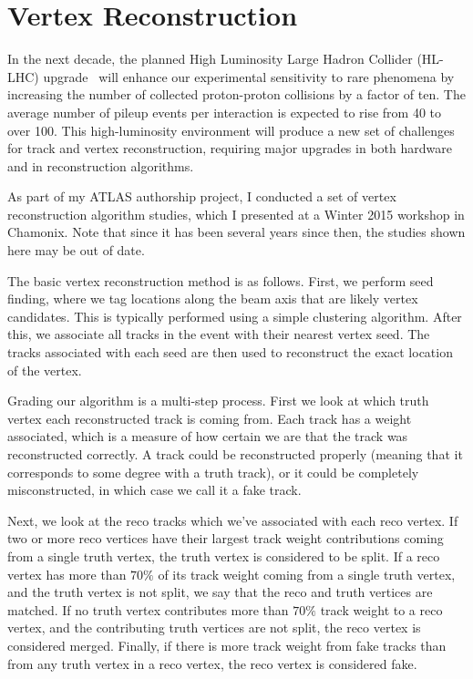 \chapter{Vertex Reconstruction}

In the next decade, the planned High Luminosity Large Hadron Collider (HL-LHC) upgrade~\cite{Apollinari:2284929} will enhance our experimental sensitivity to rare phenomena by increasing the number of collected proton-proton collisions by a factor of ten. The average number of pileup events per interaction is expected to rise from 40 to over 100. This high-luminosity environment will produce a new set of challenges for track and vertex reconstruction, requiring major upgrades in both hardware and in reconstruction algorithms.

As part of my ATLAS authorship project, I conducted a set of vertex reconstruction algorithm studies, which I presented at a Winter 2015 workshop in Chamonix. Note that since it has been several years since then, the studies shown here may be out of date.

The basic vertex reconstruction method is as follows. First, we perform seed finding, where we tag locations along the beam axis that are likely vertex candidates. This is typically performed using a simple clustering algorithm. After this, we associate all tracks in the event with their nearest vertex seed. The tracks associated with each seed are then used to reconstruct the exact location of the vertex.

Grading our algorithm is a multi-step process. First we look at which truth vertex each reconstructed track is coming from. Each track has a weight associated, which is a measure of how certain we are that the track was reconstructed correctly. A track could be reconstructed properly (meaning that it corresponds to some degree with a truth track), or it could be completely misconstructed, in which case we call it a fake track.

Next, we look at the reco tracks which we've associated with each reco vertex. If two or more reco vertices have their largest track weight contributions coming from a single truth vertex, the truth vertex is considered to be split. If a reco vertex has more than $70\%$ of its track weight coming from a single truth vertex, and the truth vertex is not split, we say that the reco and truth vertices are matched. If no truth vertex contributes more than $70\%$ track weight to a reco vertex, and the contributing truth vertices are not split, the reco vertex is considered merged. Finally, if there is more track weight from fake tracks than from any truth vertex in a reco vertex, the reco vertex is considered fake.

